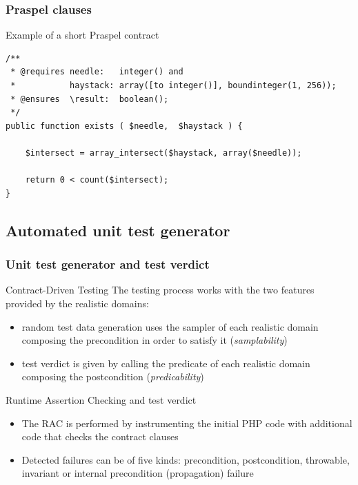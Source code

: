 \documentclass[9pt]{beamer}
\begin{document}
\begin{frame}[fragile]
\frametitle{Praspel clauses}

\begin{exampleblock}{Example of a short Praspel contract}
{
\small
\begin{verbatim}
/**
 * @requires needle:   integer() and
 *           haystack: array([to integer()], boundinteger(1, 256));
 * @ensures  \result:  boolean();
 */
public function exists ( $needle,  $haystack ) {

    $intersect = array_intersect($haystack, array($needle));

    return 0 < count($intersect);
}
\end{verbatim}
}
\end{exampleblock}

\end{frame}

\subsection{Automated unit test generator}

\begin{frame}
\frametitle{Unit test generator and test verdict}

\begin{block}{Contract-Driven Testing}
The testing process works with the two features provided by the realistic
domains:
\begin{itemize}
\item random test data generation uses the sampler of each realistic domain
composing the precondition in order to satisfy it ({\em samplability})
\item test verdict is given by calling the predicate of each realistic domain
composing the postcondition ({\em predicability})
\end{itemize}
\end{block}

\begin{block}{Runtime Assertion Checking and test verdict}
\begin{itemize}
\item The RAC is performed by instrumenting the initial PHP code with additional
code that checks the contract clauses
\item Detected failures can be of five kinds: precondition, postcondition,
throwable, invariant or internal precondition (propagation) failure
\end{itemize}
\end{block}

\end{frame}
\end{document}
